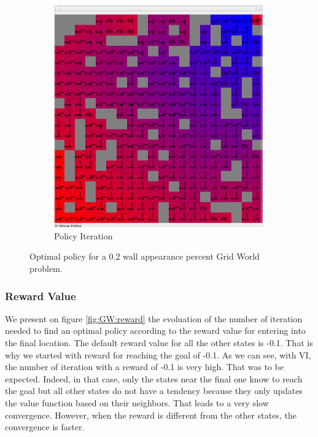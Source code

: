 \documentclass[10pt, twocolumn]{article}
\begin{document}
\begin{figure}[]
\begin{subfigure}[t]{0.24\textwidth}
						\includegraphics[width=\textwidth]{../graphics/GridWorld_0.2_pi_wallpercent.png}
						\caption{Policy Iteration}
						\label{fig:GW:obstacles:PI}
					\end{subfigure}
					\caption{Optimal policy for a 0.2 wall appearance percent Grid World problem.}
					\label{fig:GW:obstacles:comparison}
				\end{figure}
			\subsubsection*{Reward Value}
				We present on figure \ref{fig:GW:reward} the evoluation of the number of iteration needed to find an optimal policy according to the reward value for entering into the final location. The default reward value for all the other states is -0.1. That is why we started with reward for reaching the goal of -0.1. As we can see, with VI, the number of iteration with a reward of -0.1 is very high. That was to be expected. Indeed, in that case, only the states near the final one know to reach the goal but all other states do not have a tendency because they only updates the value function based on their neighbors. That leads to a very slow convergence. However, when the reward is different from the other states, the convergence is faster.
\end{document}
